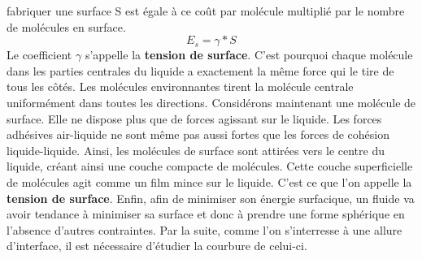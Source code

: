 \documentclass[10pt,a4paper]{article}
\begin{document}
fabriquer une surface S est égale à ce coût par molécule multiplié par le nombre de molécules en surface. \begin{equation}
E_s=\gamma *S
\end{equation}
Le coefficient $\gamma$ s'appelle la \textbf{tension de surface}.
\newline
\newline
C'est pourquoi chaque molécule dans les parties centrales du liquide a exactement la même force qui le tire de tous les côtés. Les molécules environnantes tirent la molécule centrale uniformément dans toutes les directions. Considérons maintenant une molécule de surface. Elle ne dispose plus que de forces agissant sur le liquide. Les forces adhésives air-liquide ne sont même pas aussi fortes que les forces de cohésion liquide-liquide. Ainsi, les molécules de surface sont attirées vers le centre du liquide, créant ainsi une couche compacte de molécules. Cette couche superficielle de molécules agit comme un film mince sur le liquide. C'est ce que l'on appelle la \textbf{tension de surface}.
\newline
\newline
Enfin, afin de minimiser son énergie surfacique, un fluide va avoir tendance à minimiser sa surface et donc à prendre une forme sphérique en l’absence d’autres contraintes.
\newline
\newline
Par la suite, comme l'on s'interresse à une allure d'interface, il est nécessaire d'étudier la courbure de celui-ci.
\end{document}
